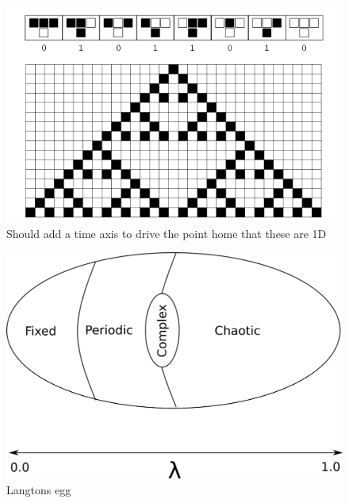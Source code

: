 \begin{figure}[h!]
  \centering
  \includegraphics[width=1\textwidth]{fig/ca22.png}
  \caption{Should add a time axis to drive the point home that these are 1D}
  \label{figCA22}
\end{figure}
\begin{figure}[h!]
  \centering
  \includegraphics[width=1\textwidth]{fig/egg.png}
  \caption{Langtons egg}
  \label{figCAegg}
\end{figure}
